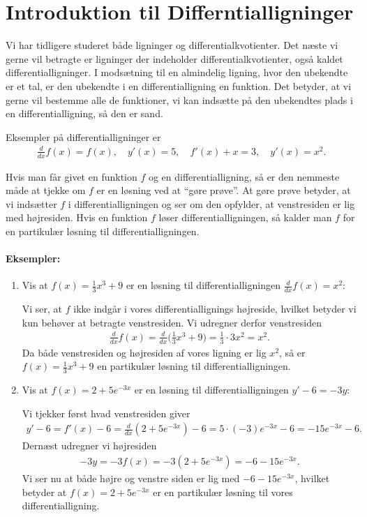 \section{Introduktion til Differntialligninger}
\noindent Vi har tidligere studeret både ligninger og differentialkvotienter. Det næste vi gerne vil betragte er ligninger der indeholder differentialkvotienter, også kaldet differentialligninger. I modsætning til en almindelig ligning, hvor den ubekendte er et tal, er den ubekendte i en differentialligning en funktion. Det betyder, at vi gerne vil bestemme alle de funktioner, vi kan indsætte på den ubekendtes plads i en differentialligning, så den er sand.

Eksempler på differentialligninger er
\begin{align*}
\frac{d}{dx}f(x) = f(x), \quad y'(x)=5, \quad f'(x) +x = 3, \quad y'(x)=x^2.
\end{align*}

Hvis man får givet en funktion $f$ og en differentialligning, så er den nemmeste måde at tjekke om $f$ er en løsning ved at ``gøre prøve''. At gøre prøve betyder, at vi indsætter $f$ i differentialligningen og ser om den opfylder, at venstresiden er lig med højresiden. Hvis en funktion $f$ løser differentialligningen, så kalder man $f$ for en partikulær løsning til differentialligningen.

\paragraph*{Eksempler:}
\begin{enumerate}
\item Vis at $f(x)=\frac{1}{3}x^3+9$ er en løsning til differentialligningen $\displaystyle \frac{d}{dx}f(x) = x^2$:

Vi ser, at $f$ ikke indgår i vores differentiallignings højreside, hvilket betyder vi kun behøver at betragte venstresiden. Vi udregner derfor venstresiden
\begin{align*}
\frac{d}{dx}f(x)= \frac{d}{dx} \Big( \frac{1}{3}x^3+9 \Big) = \frac{1}{3}\cdot 3 x^2 = x^2.
\end{align*}
Da både venstresiden og højresiden af vores ligning er lig $x^2$, så er $f(x)=\frac{1}{3}x^3 + 9$ en partikulær løsning til differentialligningen.
\item Vis at $f(x)=2+5e^{-3x}$ er en løsning til differentialligningen $y'-6=-3y$:

Vi tjekker først hvad venstresiden giver
\begin{align*}
y'-6=f'(x) -6 = \frac{d}{dx}(2+5e^{-3x} )-6 = 5 \cdot (-3) e^{-3x}-6 = -15e^{-3x}-6.
\end{align*}
Dernæst udregner vi højresiden
\begin{align*}
-3y = -3f(x) = -3(2+5e^{-3x}) = -6 -15 e^{-3x}.
\end{align*}
Vi ser nu at både højre og venstre siden er lig med $-6-15e^{-3x}$, hvilket betyder at $f(x)=2+5e^{-3x}$ er en partikulær løsning til vores differentialligning.
\end{enumerate}

